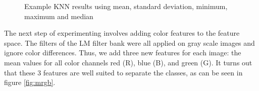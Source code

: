 \begin{figure}[!hbt]
\centering
{}
\caption{Example KNN results using mean, standard deviation, minimum, maximum and median}
\label{fig:111110}
\end{figure}

The next step of experimenting involves adding color features to the feature space. The filters of the LM filter bank were all applied on gray scale images and ignore color differences. Thus, we add three new features for each image: the mean values for all color channels red (R), blue (B), and green (G). It turns out that these 3 features are well suited to separate the classes, as can be seen in figure \ref{fig:mrgb}.  


